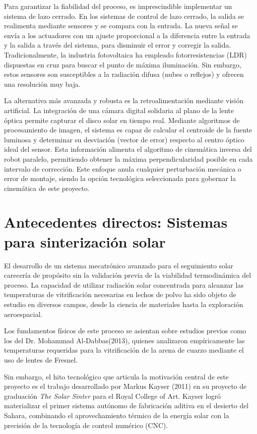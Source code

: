 Para garantizar la fiabilidad del proceso, es imprescindible implementar un sistema de lazo cerrado. En los sistemas de control de lazo cerrado, la salida se realimenta mediante sensores y se compara con la entrada. La nueva señal se envía a los actuadores con un ajuste proporcional a la diferencia entre la entrada y la salida a través del sistema, para disminuir el error y corregir la salida. Tradicionalmente, la industria fotovoltaica ha empleado fotorresistencias (\gls{LDR}) dispuestas en cruz para buscar el punto de máxima iluminación. Sin embargo, estos sensores son susceptibles a la radiación difusa (nubes o reflejos) y ofrecen una resolución muy baja.

La alternativa más avanzada y robusta es la retroalimentación mediante visión artificial. La integración de una cámara digital solidaria al plano de la lente óptica permite capturar el disco solar en tiempo real. Mediante algoritmos de procesamiento de imagen, el sistema es capaz de calcular el centroide de la fuente luminosa y determinar su desviación (vector de error) respecto al centro óptico ideal del sensor. Esta información alimenta el algoritmo de cinemática inversa del robot paralelo, permitiendo obtener la máxima perpendicularidad posible en cada intervalo de corrección. Este enfoque anula cualquier perturbación mecánica o error de montaje, siendo la opción tecnológica seleccionada para gobernar la cinemática de este proyecto.

\section{Antecedentes directos: Sistemas para sinterización solar}

El desarrollo de un sistema mecatrónico avanzado para el seguimiento solar carecería de propósito sin la validación previa de la viabilidad termodinámica del proceso. La capacidad de utilizar radiación solar concentrada para alcanzar las temperaturas de vitrificación necesarias en lechos de polvo ha sido objeto de estudio en diversos campos, desde la ciencia de materiales hasta la exploración aeroespacial.

Los fundamentos físicos de este proceso se asientan sobre estudios previos como los del  Dr. Mohammad Al-Dabbas(2013)\cite{Mohammad}, quienes analizaron empíricamente las temperaturas requeridas para la vitrificación de la arena de cuarzo mediante el uso de lentes de Fresnel.

Sin embargo, el hito tecnológico que articula la motivación central de este proyecto es el trabajo desarrollado por Markus Kayser (2011)\cite{kayser2011} en su proyecto de graduación \textit{The Solar Sinter} para el Royal College of Art. Kayser logró materializar el primer sistema autónomo de fabricación aditiva en el desierto del Sahara, combinando el aprovechamiento térmico de la energía solar con la precisión de la tecnología de control numérico (\gls{CNC}).

